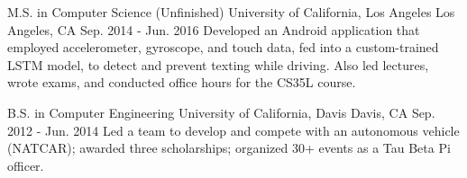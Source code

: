 

\begin{cventries}

  \cventry
    {M.S. in Computer Science \fontsize{7}{12}\selectfont (Unfinished) \fontsize{7}{12}\selectfont} %
    {University of California, Los Angeles} %
    {Los Angeles, CA} %
    {Sep. 2014 - Jun. 2016} %
    {Developed an Android application that employed accelerometer, gyroscope, and touch data, fed into a custom-trained LSTM model, to detect and prevent texting while driving. Also led lectures, wrote exams, and conducted office hours for the CS35L course.} %
    {}

  \cventry
    {B.S. in Computer Engineering} %
    {University of California, Davis} %
    {Davis, CA} %
    {Sep. 2012 - Jun. 2014} %
    {Led a team to develop and compete with an autonomous vehicle (NATCAR); awarded three scholarships; organized 30+ events as a Tau Beta Pi officer.}
    {}

\end{cventries}
